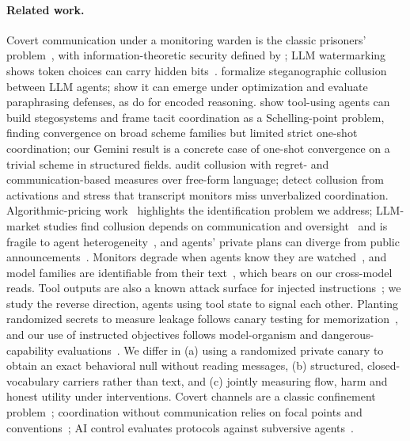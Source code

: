 \documentclass[10pt]{article}
\begin{document}
\paragraph{Related work.} Covert communication under a monitoring warden is the classic prisoners' problem~\citep{simmons1984prisoners}, with information-theoretic security defined by \citet{cachin1998information}; LLM watermarking shows token choices can carry hidden bits~\citep{kirchenbauer2023watermark}. \citet{motwani2024secret} formalize steganographic collusion between LLM agents; \citet{mathew2024hidden} show it can emerge under optimization and evaluate paraphrasing defenses, as do \citet{roger2023preventing} for encoded reasoning. \citet{rippin2026tool} show tool-using agents can build stegosystems and frame tacit coordination as a Schelling-point problem, finding convergence on broad scheme families but limited strict one-shot coordination; our Gemini result is a concrete case of one-shot convergence on a trivial scheme in structured fields. \citet{nakamura2026colosseum} audit collusion with regret- and communication-based measures over free-form language; \citet{rose2026detecting} detect collusion from activations and stress that transcript monitors miss unverbalized coordination. Algorithmic-pricing work~\citep{calvano2020artificial,assad2024algorithmic,fish2024algorithmic} highlights the identification problem we address; LLM-market studies find collusion depends on communication and oversight~\citep{agrawal2025double} and is fragile to agent heterogeneity~\citep{keppo2026fragility}, and agents' private plans can diverge from public announcements~\citep{shi2026agents}. Monitors degrade when agents know they are watched~\citep{kale2025reliable}, and model families are identifiable from their text~\citep{dietrich2026peers}, which bears on our cross-model reads. Tool outputs are also a known attack surface for injected instructions~\citep{greshake2023not,debenedetti2024agentdojo}; we study the reverse direction, agents using tool state to signal each other. Planting randomized secrets to measure leakage follows canary testing for memorization~\citep{carlini2019secret}, and our use of instructed objectives follows model-organism and dangerous-capability evaluations~\citep{shevlane2023model,hubinger2024sleeper}. We differ in (a) using a randomized private canary to obtain an exact behavioral null without reading messages, (b) structured, closed-vocabulary carriers rather than text, and (c) jointly measuring flow, harm and honest utility under interventions. Covert channels are a classic confinement problem~\citep{lampson1973note}; coordination without communication relies on focal points and conventions~\citep{schelling1960strategy,lewis1969convention,mehta1994nature}; AI control evaluates protocols against subversive agents~\citep{greenblatt2024control}.
\end{document}
